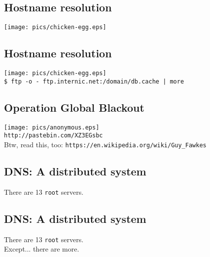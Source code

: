 \documentclass[xga]{xdvislides}
\begin{document}
\subsection{Hostname resolution}
\vspace*{\fill}
\begin{center}
	\texttt{[image: pics/chicken-egg.eps]} \\
	\vspace*{\fill}
\end{center}

\subsection{Hostname resolution}
\vspace*{\fill}
\begin{center}
	\texttt{[image: pics/chicken-egg.eps]} \\
	\addvspace{.2in}
	\verb+$ ftp -o - ftp.internic.net:/domain/db.cache | more+
	\vspace*{\fill}
\end{center}

\subsection{Operation Global Blackout}
\vspace*{\fill}
\begin{center}
	\texttt{[image: pics/anonymous.eps]} \\
	\addvspace{.2in}
	\verb+http://pastebin.com/XZ3EGsbc+ \\
	\addvspace{.1in}
	\small
	Btw, read this, too: \verb+https://en.wikipedia.org/wiki/Guy_Fawkes+
\end{center}
\vspace*{\fill}

\subsection{DNS: A distributed system}
\vspace{.5in}
\begin{center}
	\Huge
	There are 13 \verb+root+ servers. \\
\end{center}
\Normalsize

\subsection{DNS: A distributed system}
\vspace{.5in}
\begin{center}
	\Huge
	There are 13 \verb+root+ servers. \\
	\vspace{.5in}
	Except... there are more.
\end{center}
\Normalsize
\end{document}
